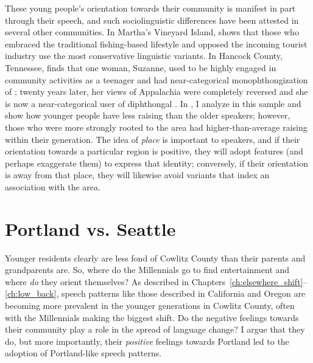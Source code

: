 These young people's orientation towards their community is manifest in part through their speech, and such sociolinguistic differences have been attested in several other communities. In Martha's Vineyard Island, \citet{labov_1963} shows that those who embraced the traditional fishing-based lifestyle and opposed the incoming tourist industry use the most conservative linguistic variants. In Hancock County, Tennessee, \citet{reed_2018} finds that one woman, Suzanne, used to be highly engaged in community activities as a teenager and had near-categorical monophthongization of \price; twenty years later, her views of Appalachia were completely reversed and she is now a near-categorical user of diphthongal \price. In \citet{stanley_2018_pwpl}, I analyze \bag in this sample and show how younger people have less raising than the older speakers; however, those who were more strongly rooted to the area had higher-than-average \bag raising within their generation. The idea of \textit{place} is important to speakers, and if their orientation towards a particular region is positive, they will adopt features (and perhaps exaggerate them) to express that identity; conversely, if their orientation is away from that place, they will likewise avoid variants that index an association with the area.




\section{Portland vs. Seattle}
\label{sec:portland_vs_seattle}

Younger residents clearly are less fond of Cowlitz County than their parents and grandparents are. So, where do the Millennials go to find entertainment and where \textit{do} they orient themselves? As described in Chapters~\ref{ch:elsewhere_shift}--\ref{ch:low_back}, speech patterns like those described in California and Oregon are becoming more prevalent in the younger generations in Cowlitz County, often with the Millennials making the biggest shift. Do the negative feelings towards their community play a role in the spread of language change? I argue that they do, but more importantly, their \textit{positive} feelings towards Portland led to the adoption of Portland-like speech patterns.

